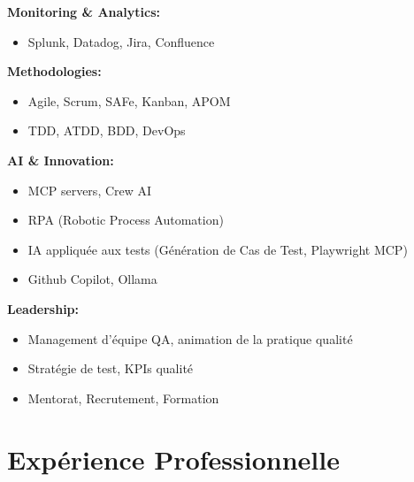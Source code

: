 \documentclass[11pt,a4paper]{article}
\begin{document}
\begin{minipage}[t]{0.48\textwidth}
\textbf{Monitoring \& Analytics:}
\begin{itemize}[leftmargin=10pt]
    \item Splunk, Datadog, Jira, Confluence
\end{itemize}

\textbf{Methodologies:}
\begin{itemize}[leftmargin=10pt]
    \item Agile, Scrum, SAFe, Kanban, APOM
    \item TDD, ATDD, BDD, DevOps
\end{itemize}

\textbf{AI \& Innovation:}
\begin{itemize}[leftmargin=10pt]
    \item MCP servers, Crew AI
    \item RPA (Robotic Process Automation)
    \item IA appliquée aux tests (Génération de Cas de Test, Playwright MCP)
    \item Github Copilot, Ollama
\end{itemize}

\textbf{Leadership:}
\begin{itemize}[leftmargin=10pt]
    \item Management d'équipe QA, animation de la pratique qualité
    \item Stratégie de test, KPIs qualité
    \item Mentorat, Recrutement, Formation
\end{itemize}
\end{minipage}

\vspace{4pt}

\section*{Expérience Professionnelle}
\end{document}
